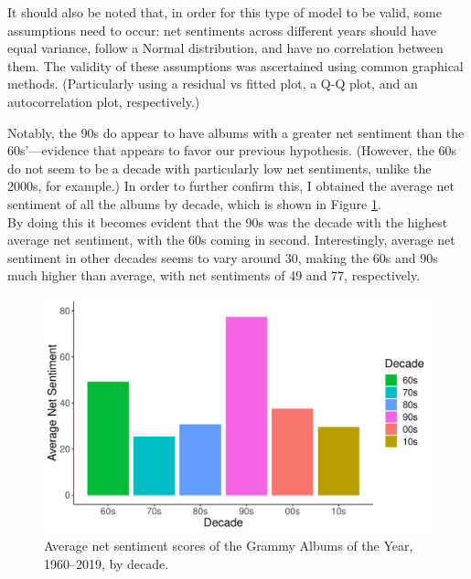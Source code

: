 \documentclass{article}
\newenvironment{aside}
  {\begin{mdframed}[style=0,%
      leftline=false,rightline=false,leftmargin=2em,rightmargin=2em,%
          innerleftmargin=0pt,innerrightmargin=0pt,linewidth=0.75pt,%
      skipabove=7pt,skipbelow=7pt]\small}
  {\end{mdframed}}
\begin{document}
\begin{aside}
        It should also be noted that, in order for this type of model to be valid, some assumptions need to occur: net sentiments across different years should have equal variance, follow a Normal distribution, and have no correlation between them. The validity of these assumptions was ascertained using common graphical methods. (Particularly using a residual vs fitted plot, a Q-Q plot, and an autocorrelation plot, respectively.)
\end{aside}

\vskip 0.5cm

\FloatBarrier



Notably, the 90s do appear to have albums with a greater net sentiment than the 60s'---evidence that appears to favor our previous hypothesis. (However, the 60s do not seem to be a decade with particularly low net sentiments, unlike the 2000s, for example.) In order to further confirm this, I obtained the average net sentiment of all the albums by decade, which is shown in Figure \ref{fig:decade_sentiment}. \\


By doing this it becomes evident that the 90s was the decade with the highest average net sentiment, with the 60s coming in second. Interestingly, average net sentiment in other decades seems to vary around 30, making the 60s and 90s much higher than average, with net sentiments of 49 and 77, respectively.


\begin{figure}[h]
    \centering
    \includegraphics[scale=0.5]{Plots/graph_decade_mean_sentiment.pdf}
    \caption{Average net sentiment scores of the Grammy Albums of the Year, 1960--2019, by decade.}
    \label{fig:decade_sentiment}
\end{figure}
\end{document}
